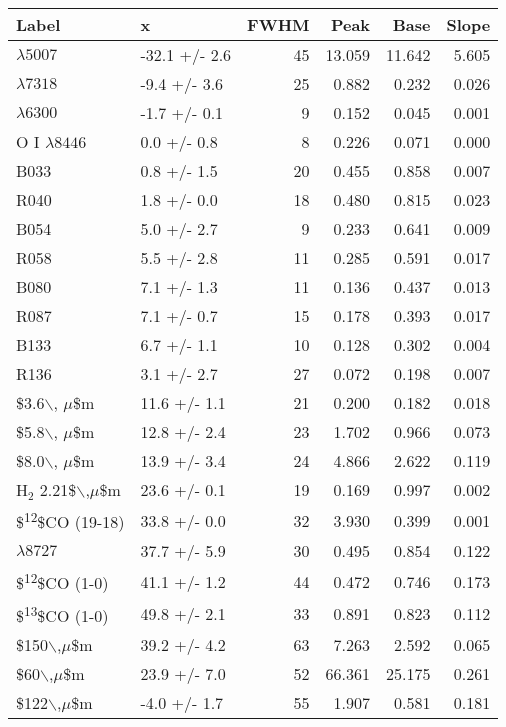 \begin{tabular}{llrrrr}
Label & x & FWHM & Peak & Base & Slope\\
\hline
[O III] \(\lambda 5007\) & -32.1 +/- 2.6 & 45 & 13.059 & 11.642 & 5.605\\
[O II] \(\lambda 7318\) & -9.4 +/- 3.6 & 25 & 0.882 & 0.232 & 0.026\\
[O I] \(\lambda 6300\) & -1.7 +/- 0.1 & 9 & 0.152 & 0.045 & 0.001\\
O I \(\lambda 8446\) & 0.0 +/- 0.8 & 8 & 0.226 & 0.071 & 0.000\\
\hline
B033 & 0.8 +/- 1.5 & 20 & 0.455 & 0.858 & 0.007\\
R040 & 1.8 +/- 0.0 & 18 & 0.480 & 0.815 & 0.023\\
B054 & 5.0 +/- 2.7 & 9 & 0.233 & 0.641 & 0.009\\
R058 & 5.5 +/- 2.8 & 11 & 0.285 & 0.591 & 0.017\\
B080 & 7.1 +/- 1.3 & 11 & 0.136 & 0.437 & 0.013\\
R087 & 7.1 +/- 0.7 & 15 & 0.178 & 0.393 & 0.017\\
B133 & 6.7 +/- 1.1 & 10 & 0.128 & 0.302 & 0.004\\
R136 & 3.1 +/- 2.7 & 27 & 0.072 & 0.198 & 0.007\\
\hline
\$3.6$\backslash$, \(\mu\)\$m & 11.6 +/- 1.1 & 21 & 0.200 & 0.182 & 0.018\\
\$5.8$\backslash$, \(\mu\)\$m & 12.8 +/- 2.4 & 23 & 1.702 & 0.966 & 0.073\\
\$8.0$\backslash$, \(\mu\)\$m & 13.9 +/- 3.4 & 24 & 4.866 & 2.622 & 0.119\\
\hline
H\(_{2}\) 2.21\$$\backslash$,\(\mu\)\$m & 23.6 +/- 0.1 & 19 & 0.169 & 0.997 & 0.002\\
\$\textsuperscript{12}\$CO (19-18) & 33.8 +/- 0.0 & 32 & 3.930 & 0.399 & 0.001\\
[C I] \(\lambda 8727\) & 37.7 +/- 5.9 & 30 & 0.495 & 0.854 & 0.122\\
\$\textsuperscript{12}\$CO (1-0) & 41.1 +/- 1.2 & 44 & 0.472 & 0.746 & 0.173\\
\$\textsuperscript{13}\$CO (1-0) & 49.8 +/- 2.1 & 33 & 0.891 & 0.823 & 0.112\\
\hline
\$150$\backslash$,\(\mu\)\$m & 39.2 +/- 4.2 & 63 & 7.263 & 2.592 & 0.065\\
\$60$\backslash$,\(\mu\)\$m & 23.9 +/- 7.0 & 52 & 66.361 & 25.175 & 0.261\\
\hline
[N II] \$122$\backslash$,\(\mu\)\$m & -4.0 +/- 1.7 & 55 & 1.907 & 0.581 & 0.181\\

\end{tabular}
